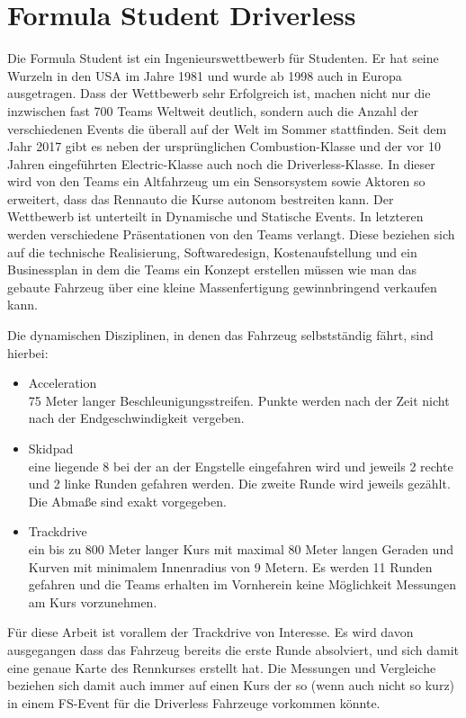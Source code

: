 \documentclass{like}
\begin{document}
\section{Formula Student Driverless}

Die Formula Student ist ein Ingenieurswettbewerb für Studenten. Er hat seine Wurzeln in den USA im Jahre 1981 und wurde ab 1998 auch in Europa ausgetragen.
Dass der Wettbewerb sehr Erfolgreich ist, machen nicht nur die inzwischen fast 700 Teams Weltweit \cite{FsWorldRank:1} deutlich, sondern auch die Anzahl der verschiedenen Events die überall auf der Welt im Sommer stattfinden. Seit dem Jahr 2017 gibt es neben der ursprünglichen Combustion-Klasse und der vor 10 Jahren eingeführten Electric-Klasse auch noch die Driverless-Klasse.
In dieser wird von den Teams ein Altfahrzeug um ein Sensorsystem sowie Aktoren so erweitert, dass das Rennauto die Kurse autonom bestreiten kann.
Der Wettbewerb ist unterteilt in Dynamische und Statische Events. In letzteren werden verschiedene Präsentationen von den Teams verlangt. Diese beziehen sich auf die technische Realisierung, Softwaredesign, Kostenaufstellung und ein Businessplan in dem die Teams ein Konzept erstellen müssen wie man das gebaute Fahrzeug über eine kleine Massenfertigung gewinnbringend verkaufen kann.

Die dynamischen Disziplinen, in denen das Fahrzeug selbstständig fährt, sind hierbei:
\begin{itemize}
	\item Acceleration \\ 75 Meter langer Beschleunigungsstreifen. Punkte werden nach der Zeit nicht nach der Endgeschwindigkeit vergeben.
	\item Skidpad \\ eine liegende 8 bei der an der Engstelle eingefahren wird und jeweils 2 rechte und 2 linke Runden gefahren werden. Die zweite Runde wird jeweils gezählt. Die Abmaße sind exakt vorgegeben.
	\item Trackdrive \\ ein bis zu 800 Meter langer Kurs mit maximal 80 Meter langen Geraden und Kurven mit minimalem Innenradius von 9 Metern. Es werden 11 Runden gefahren und die Teams erhalten im Vornherein keine Möglichkeit Messungen am Kurs vorzunehmen.
\end{itemize}

Für diese Arbeit ist vorallem der Trackdrive von Interesse. Es wird davon ausgegangen dass das Fahrzeug bereits die erste Runde absolviert, und sich damit eine genaue Karte des Rennkurses erstellt hat. Die Messungen und Vergleiche beziehen sich damit auch immer auf einen Kurs der so (wenn auch nicht so kurz) in einem FS-Event für die Driverless Fahrzeuge vorkommen könnte.
 
\end{document}
